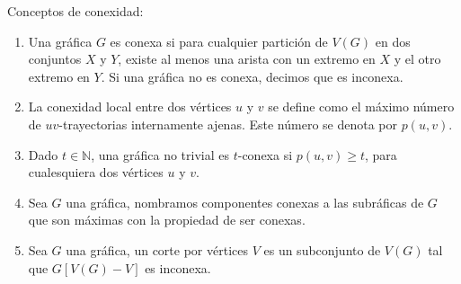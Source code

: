 \begin{definicion} Conceptos de conexidad:
    \label{def:conexidad}
    \begin{enumerate}    
        \item Una gr\'afica $G$ es conexa si para cualquier partici\'on de
        $V(G)$ en dos conjuntos $X$ y $Y$, existe al menos una arista con un
        extremo en $X$ y el otro extremo en $Y$. Si una gr\'afica no es conexa,
        decimos que es inconexa.
        \item La conexidad local entre dos v\'ertices $u$ y $v$ se define como
        el m\'aximo n\'umero de $uv$-trayectorias internamente ajenas. Este
        n\'umero se denota por $p(u,v)$.
        \item Dado $t \in \mathbb{N}$, una gr\'afica no trivial es $t$-conexa si
        $p(u,v) \geq t$, para cualesquiera dos v\'ertices $u$ y $v$. 
        \item Sea $G$ una gr\'afica, nombramos componentes conexas a las
        subr\'aficas de $G$ que son m\'aximas con la propiedad de ser conexas.
        \item Sea $G$ una gr\'afica, un corte por v\'ertices $V$ es un
        subconjunto de $V(G)$ tal que $G[V(G)-V]$ es inconexa.
    \end{enumerate}
\end{definicion}

